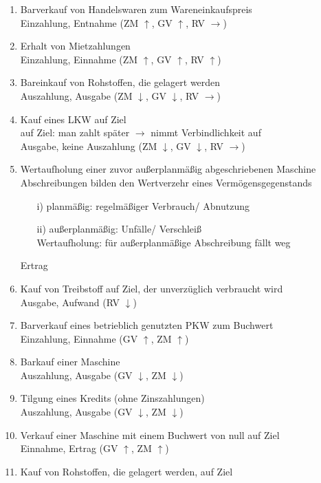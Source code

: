 \documentclass[paper=a4, fontsize=11pt]{scrartcl}
\numberwithin{equation}{section}
\numberwithin{figure}{section}
\numberwithin{table}{section}
\begin{document}
\begin{enumerate}
\item Barverkauf von Handelswaren zum Wareneinkaufspreis \\
Einzahlung, Entnahme (ZM $\uparrow$, GV $\uparrow$, RV $\rightarrow$)
\item Erhalt von Mietzahlungen \\
Einzahlung, Einnahme (ZM $\uparrow$, GV $\uparrow$, RV $\uparrow$)
\item Bareinkauf von Rohstoffen, die gelagert werden \\
Auszahlung, Ausgabe (ZM $\downarrow$, GV $\downarrow$, RV $\rightarrow$)
\item Kauf eines LKW auf Ziel \\
auf Ziel: man zahlt später $\rightarrow$ nimmt Verbindlichkeit auf \\
Ausgabe, keine Auszahlung (ZM $\downarrow$, GV $\downarrow$, RV $\rightarrow$)
\item Wertaufholung einer zuvor außerplanmäßig abgeschriebenen Maschine \\
Abschreibungen bilden den Wertverzehr eines Vermögensgegenstands 
\begin{itemize}
\item[i)] planmäßig: regelmäßiger Verbrauch/ Abnutzung
\item[ii)] außerplanmäßig: Unfälle/ Verschleiß \\
Wertaufholung: für außerplanmäßige Abschreibung fällt weg
\end{itemize}
Ertrag
\item Kauf von Treibstoff auf Ziel, der unverzüglich verbraucht wird \\
Ausgabe, Aufwand (RV $\downarrow$)
\item Barverkauf eines betrieblich genutzten PKW zum Buchwert \\
Einzahlung, Einnahme (GV $\uparrow$, ZM $\uparrow$)
\item Barkauf einer Maschine \\
Auszahlung, Ausgabe (GV $\downarrow$, ZM $\downarrow$)
\item Tilgung eines Kredits (ohne Zinszahlungen) \\
Auszahlung, Ausgabe (GV $\downarrow$, ZM $\downarrow$)
\item Verkauf einer Maschine mit einem Buchwert von null auf Ziel \\
Einnahme, Ertrag (GV $\uparrow$, ZM $\uparrow$)
\item Kauf von Rohstoffen, die gelagert werden, auf Ziel \\

\end{enumerate}
\end{document}
